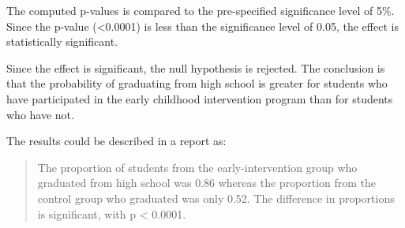 The computed p-values is compared to the pre-specified significance level of 5\%. Since the p-value (<0.0001) is less than the significance level of 0.05, the effect is statistically significant.

Since the effect is significant, the null hypothesis is rejected. The conclusion is that the probability of graduating from high school is greater for students who have participated in the early childhood intervention program than for students who have not.

The results could be described in a report as:
\begin{quote}
The proportion of students from the early-intervention group who graduated from high school was 0.86 whereas the proportion from the control group who graduated was only 0.52. The difference in proportions is significant, with p < 0.0001.
\end{quote}

